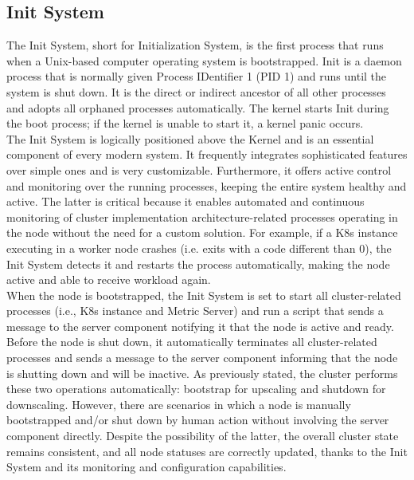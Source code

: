 \subsection{Init System}
\label{subsec:implementation_distributions_init_system}

The Init System, short for Initialization System, is the first process that runs
when a Unix-based computer operating system is bootstrapped. Init is a daemon
process that is normally given Process IDentifier 1 (PID 1) and runs until the
system is shut down. It is the direct or indirect ancestor of all other processes
and adopts all orphaned processes automatically. The kernel starts Init during
the boot process; if the kernel is unable to start it, a kernel panic occurs\cite{init_system}.
\\ %
The Init System is logically positioned above the Kernel and is an essential component
of every modern system. It frequently integrates sophisticated features over
simple ones and is very customizable. Furthermore, it offers active control and
monitoring over the running processes, keeping the entire system healthy and active.
The latter is critical because it enables automated and continuous monitoring of
cluster implementation architecture-related processes operating in the node
without the need for a custom solution. For example, if a K8s instance executing
in a worker node crashes (i.e. exits with a code different than 0), the Init
System detects it and restarts the process automatically, making the node active
and able to receive workload again. \\ %
When the node is bootstrapped, the Init System is set to start all cluster-related
processes (i.e., K8s instance and Metric Server) and run a script that sends a
message to the server component notifying it that the node is active and ready. Before
the node is shut down, it automatically terminates all cluster-related processes
and sends a message to the server component informing that the node is shutting
down and will be inactive. As previously stated, the cluster performs these two
operations automatically: bootstrap for upscaling and shutdown for downscaling.
However, there are scenarios in which a node is manually bootstrapped and/or shut
down by human action without involving the server component directly. Despite
the possibility of the latter, the overall cluster state remains consistent, and
all node statuses are correctly updated, thanks to the Init System and its monitoring
and configuration capabilities. \\ %
